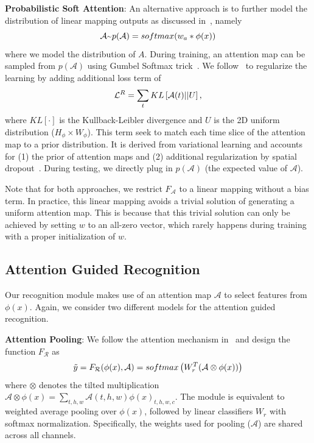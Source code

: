 \documentclass[10pt,twocolumn,letterpaper]{article}
\newcommand{\app}{\raise.17ex\hbox{$\scriptstyle\sim$}}
\begin{document}
\noindent \textbf{Probabilistic Soft Attention}: An alternative approach is to further model the distribution of linear mapping outputs as discussed in~\cite{Li_2018_ECCV}, namely 
\begin{equation}
\small
    \mathcal{A} \app p(\mathcal{A}) = softmax(w_a * \phi(x))
\end{equation}
where we model the distribution of $A$. During training, an attention map can be sampled from $p(\mathcal{A})$ using Gumbel Softmax trick~\cite{jang2016categorical, maddison2016concrete}. We follow~\cite{Li_2018_ECCV} to regularize the learning by adding additional loss term of 
\begin{equation}
\label{eq:reg_atten}
\small
    \mathcal{L}^R = \sum_t KL\left[\mathcal{A}(t) || U\right], 
\end{equation}
where $KL[\cdot]$ is the Kullback-Leibler divergence and $U$ is the 2D uniform distribution ($H_\phi \times W_\phi$). This term seek to match each time slice of the attention map to a prior distribution. It is derived from variational learning and accounts for (1) the prior of attention maps and (2) additional regularization by spatial dropout~\cite{Li_2018_ECCV}. During testing, we directly plug in $p(\mathcal{A})$ (the expected value of $\mathcal{A}$).

Note that for both approaches, we restrict $F_{\mathcal{A}}$ to a linear mapping without a bias term. In practice, this linear mapping avoids a trivial solution of generating a uniform attention map. This is because that this trivial solution can only be achieved by setting $w$ to an all-zero vector, which rarely happens during training with a proper initialization of $w$.

\subsection{Attention Guided Recognition}
Our recognition module makes use of an attention map $\mathcal{A}$ to select features from $\phi(x)$. Again, we consider two different models for the attention guided recognition. 

\noindent \textbf{Attention Pooling}: We follow the attention mechanism in~\cite{wang2017residual,liu2018end} and design the function $F_{\mathcal{R}}$ as 
\begin{equation}
\label{eq:direct_atten}
\small
    \Tilde{y} = F_{\mathcal{R}}(\phi(x), \mathcal{A}) = softmax\left( W_r^T (\mathcal{A} \otimes \phi(x)) \right)
\end{equation}
where $\otimes$ denotes the tilted multiplication $\mathcal{A} \otimes \phi(x) = \sum_{t,h,w} \mathcal{A}(t, h, w) \phi(x)_{t,h,w,c}$. The module is equivalent to weighted average pooling over $\phi(x)$, followed by linear classifiers $W_r$ with softmax normalization. Specifically, the weights used for pooling ($\mathcal{A}$) are shared across all channels.
 
\end{document}
